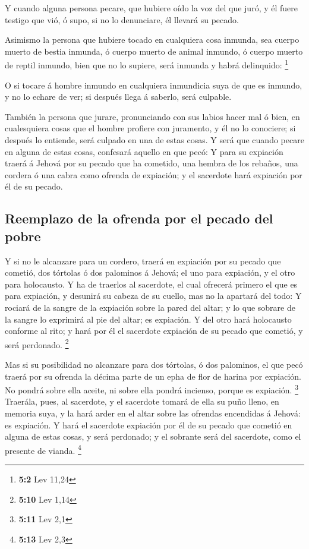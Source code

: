  Y cuando alguna persona pecare, que hubiere oído la voz del
que juró, y él fuere testigo que vió, ó supo, si no lo denunciare, él
llevará su pecado.

 Asimismo la persona que hubiere tocado en cualquiera cosa
inmunda, sea cuerpo muerto de bestia inmunda, ó cuerpo muerto de animal
inmundo, ó cuerpo muerto de reptil inmundo, bien que no lo supiere, será
inmunda y habrá delinquido: \footnote{\textbf{5:2} Lev 11,24}

 O si tocare á hombre inmundo en cualquiera inmundicia suya
de que es inmundo, y no lo echare de ver; si después llega á saberlo,
será culpable.

 También la persona que jurare, pronunciando con sus labios
hacer mal ó bien, en cualesquiera cosas que el hombre profiere con
juramento, y él no lo conociere; si después lo entiende, será culpado en
una de estas cosas.  Y será que cuando pecare en alguna de
estas cosas, confesará aquello en que pecó:  Y para su
expiación traerá á Jehová por su pecado que ha cometido, una hembra de
los rebaños, una cordera ó una cabra como ofrenda de expiación; y el
sacerdote hará expiación por él de su pecado.

\hypertarget{reemplazo-de-la-ofrenda-por-el-pecado-del-pobre}{%
\subsection{Reemplazo de la ofrenda por el pecado del
pobre}\label{reemplazo-de-la-ofrenda-por-el-pecado-del-pobre}}

 Y si no le alcanzare para un cordero, traerá en expiación
por su pecado que cometió, dos tórtolas ó dos palominos á Jehová; el uno
para expiación, y el otro para holocausto.  Y ha de traerlos
al sacerdote, el cual ofrecerá primero el que es para expiación, y
desunirá su cabeza de su cuello, mas no la apartará del todo:
 Y rociará de la sangre de la expiación sobre la pared del
altar; y lo que sobrare de la sangre lo exprimirá al pie del altar; es
expiación.  Y del otro hará holocausto conforme al rito; y
hará por él el sacerdote expiación de su pecado que cometió, y será
perdonado. \footnote{\textbf{5:10} Lev 1,14}

 Mas si su posibilidad no alcanzare para dos tórtolas, ó
dos palominos, el que pecó traerá por su ofrenda la décima parte de un
epha de flor de harina por expiación. No pondrá sobre ella aceite, ni
sobre ella pondrá incienso, porque es expiación. \footnote{\textbf{5:11}
  Lev 2,1}  Traerála, pues, al sacerdote, y el sacerdote
tomará de ella su puño lleno, en memoria suya, y la hará arder en el
altar sobre las ofrendas encendidas á Jehová: es expiación.
 Y hará el sacerdote expiación por él de su pecado que
cometió en alguna de estas cosas, y será perdonado; y el sobrante será
del sacerdote, como el presente de vianda. \footnote{\textbf{5:13} Lev
  2,3}

